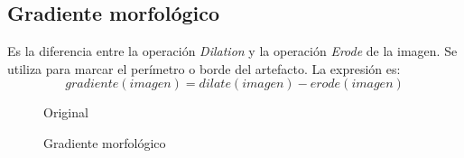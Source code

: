 \subsection{Gradiente morfológico}
Es la diferencia entre la operación \emph{Dilation} y la operación
\emph{Erode} de la imagen. Se utiliza para marcar el perímetro o borde
del artefacto. La expresión es:
\begin{equation*}
  gradiente(imagen) = dilate(imagen) - erode(imagen)
\end{equation*}

\begin{figure}[H]
  \caption{Original}
  \centering \setlength\fboxsep{0pt} \setlength\fboxrule{0.5pt}
\end{figure}

\begin{figure}[H]
  \centering \setlength\fboxsep{0pt} \setlength\fboxrule{0.5pt}
  \caption{Gradiente morfológico}
\end{figure}

